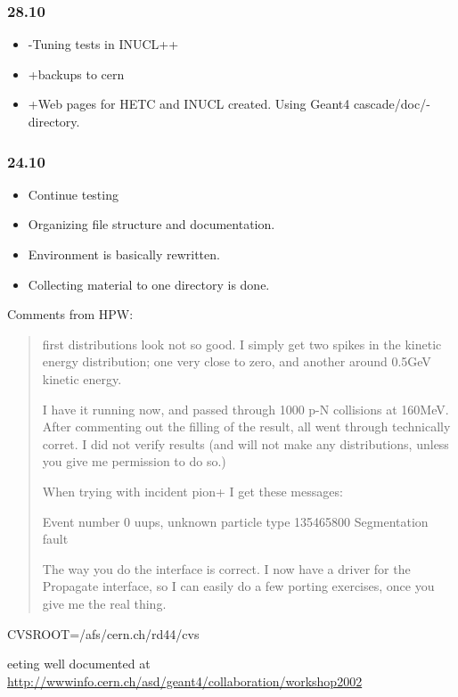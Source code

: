 \subsubsection{28.10}
\begin{itemize}
\item -Tuning tests in INUCL++
\item +backups to cern
\item +Web pages for HETC and INUCL created. Using Geant4
  cascade/doc/-directory.
\end{itemize}


\subsubsection{24.10}

\begin{itemize}
\item Continue testing
\item Organizing file structure and documentation.
\item Environment is basically rewritten.
\item Collecting material to one directory is done.
\end{itemize}

Comments from HPW:
\begin{quotation} 

  
  first distributions look not so good. I simply get two spikes in the
  kinetic energy distribution; one very close to zero, and another
  around 0.5GeV kinetic energy.
  
  I have it running now, and passed through 1000 p-N collisions at
  160MeV.  After commenting out the filling of the result, all went
  through technically corret.  I did not verify results (and will not
  make any distributions, unless you give me permission to do so.)
 
  When trying with incident pion+ I get these messages:
 
  Event number 0 uups, unknown particle type 135465800 Segmentation
  fault

                          
  The way you do the interface is correct.  I now have a driver for
  the Propagate interface, so I can easily do a few porting exercises,
  once you give me the real thing.

\end{quotation}


CVSROOT=/afs/cern.ch/rd44/cvs

eeting well documented at \url{http://wwwinfo.cern.ch/asd/geant4/collaboration/workshop2002}
\scriptsize

